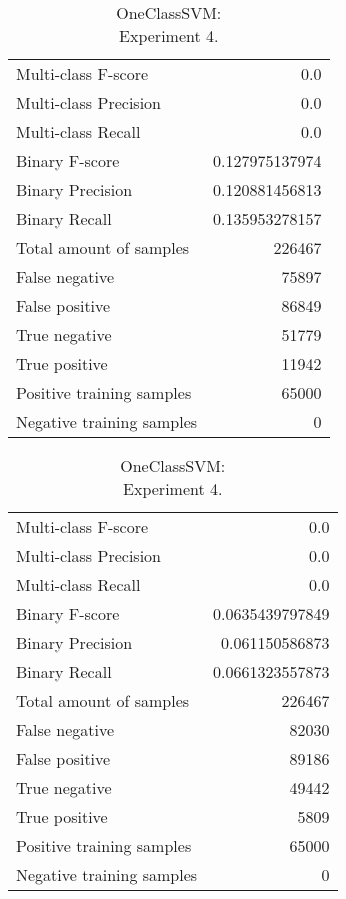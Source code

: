 \begin{table}[H]
\begin{minipage}{0.5\textwidth}
\caption{OneClassSVM: \\Experiment 3.}

\centering
\begin{tabular}{l r}
\toprule
Multi-class F-score & 0.0 \\
Multi-class Precision & 0.0 \\
Multi-class Recall & 0.0 \\
\midrule
Binary F-score & 0.127975137974 \\
Binary Precision & 0.120881456813 \\
Binary Recall & 0.135953278157 \\
\midrule
Total amount of samples & 226467 \\

False negative & 75897 \\
False positive & 86849 \\
True negative & 51779 \\
True positive & 11942 \\
\midrule
Positive training samples & 65000 \\
Negative training samples & 0 \\
\bottomrule
\end{tabular}

\end{minipage}
\hfillx
\begin{minipage}{0.5\textwidth}
\caption{OneClassSVM: \\Experiment 4.}

\centering
\begin{tabular}{l r}
\toprule
Multi-class F-score & 0.0 \\
Multi-class Precision & 0.0 \\
Multi-class Recall & 0.0 \\
\midrule
Binary F-score & 0.0635439797849 \\
Binary Precision & 0.061150586873 \\
Binary Recall & 0.0661323557873 \\
\midrule
Total amount of samples & 226467 \\

False negative & 82030 \\
False positive & 89186 \\
True negative & 49442 \\
True positive & 5809 \\
\midrule
Positive training samples & 65000 \\
Negative training samples & 0 \\
\bottomrule
\end{tabular}
\end{minipage}
\end{table}
